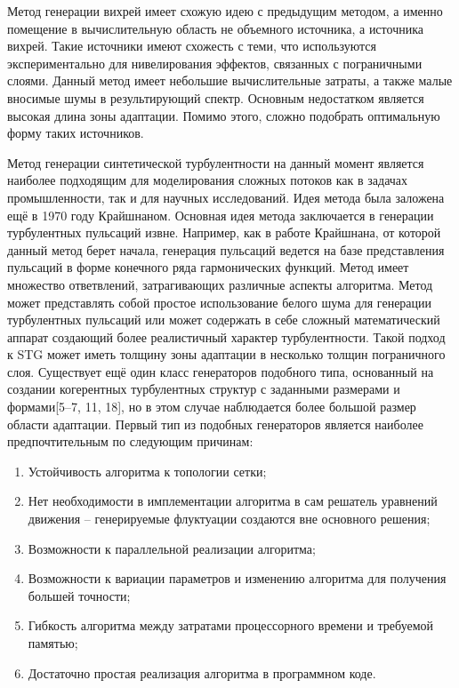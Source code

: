 Метод генерации вихрей имеет схожую идею с предыдущим методом, а именно помещение в вычислительную область не объемного источника, а источника вихрей\cite{lin1999control}. Такие источники имеют схожесть с теми, что используются экспериментально для нивелирования эффектов, связанных с пограничными слоями. Данный метод имеет небольшие вычислительные затраты, а также малые вносимые шумы в результирующий спектр. Основным недостатком является высокая длина зоны адаптации. Помимо этого, сложно подобрать оптимальную форму таких источников. 

Метод генерации синтетической турбулентности на данный момент является наиболее подходящим для моделирования сложных потоков как в задачах промышленности, так и для научных исследований. Идея метода была заложена ещё в 1970 году Крайшнаном\cite{Kraichnan70}. Основная идея метода заключается в генерации турбулентных пульсаций извне. Например, как в работе Крайшнана, от которой данный метод берет начала, генерация пульсаций ведется на базе представления пульсаций в форме конечного ряда гармонических функций. Метод имеет множество ответвлений, затрагивающих различные аспекты алгоритма\cite{adamian2011efficient, huang2010general, shur2011rapid, shur2014synthetic}. Метод может представлять собой простое использование белого шума для генерации турбулентных пульсаций или может содержать в себе сложный математический аппарат создающий более реалистичный характер турбулентности. Такой подход к STG может иметь толщину зоны адаптации в несколько толщин пограничного слоя. Существует ещё один класс генераторов подобного типа, основанный на создании когерентных турбулентных структур с заданными размерами и формами[5–7, 11, 18]\cite{jarrin2006synthetic, klein2003digital, kornev2007method, di2006synthetic, veloudis2007novel}, но в этом случае наблюдается более большой размер области адаптации. Первый тип из подобных генераторов является наиболее предпочтительным по следующим причинам: 

\begin{enumerate}
    \item Устойчивость алгоритма к топологии сетки;
    \item Нет необходимости в имплементации алгоритма в сам решатель уравнений движения – генерируемые флуктуации создаются вне основного решения;
    \item Возможности к параллельной реализации алгоритма;
    \item Возможности к вариации параметров и изменению алгоритма для получения большей точности; 
    \item Гибкость алгоритма между затратами процессорного времени и требуемой памятью; \
    \item Достаточно простая реализация алгоритма в программном коде.
\end{enumerate}   

